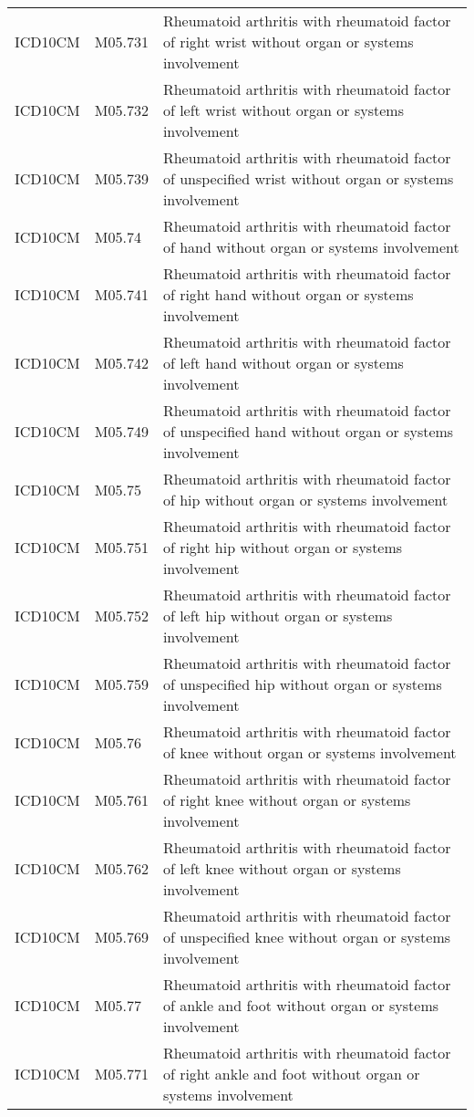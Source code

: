 \begin{longtable}{p{}p{}p{}}
  ICD10CM & M05.731 & Rheumatoid arthritis with rheumatoid factor of right wrist without organ or systems involvement \\ 
  ICD10CM & M05.732 & Rheumatoid arthritis with rheumatoid factor of left wrist without organ or systems involvement \\ 
  ICD10CM & M05.739 & Rheumatoid arthritis with rheumatoid factor of unspecified wrist without organ or systems involvement \\ 
  ICD10CM & M05.74 & Rheumatoid arthritis with rheumatoid factor of hand without organ or systems involvement \\ 
  ICD10CM & M05.741 & Rheumatoid arthritis with rheumatoid factor of right hand without organ or systems involvement \\ 
  ICD10CM & M05.742 & Rheumatoid arthritis with rheumatoid factor of left hand without organ or systems involvement \\ 
  ICD10CM & M05.749 & Rheumatoid arthritis with rheumatoid factor of unspecified hand without organ or systems involvement \\ 
  ICD10CM & M05.75 & Rheumatoid arthritis with rheumatoid factor of hip without organ or systems involvement \\ 
  ICD10CM & M05.751 & Rheumatoid arthritis with rheumatoid factor of right hip without organ or systems involvement \\ 
  ICD10CM & M05.752 & Rheumatoid arthritis with rheumatoid factor of left hip without organ or systems involvement \\ 
  ICD10CM & M05.759 & Rheumatoid arthritis with rheumatoid factor of unspecified hip without organ or systems involvement \\ 
  ICD10CM & M05.76 & Rheumatoid arthritis with rheumatoid factor of knee without organ or systems involvement \\ 
  ICD10CM & M05.761 & Rheumatoid arthritis with rheumatoid factor of right knee without organ or systems involvement \\ 
  ICD10CM & M05.762 & Rheumatoid arthritis with rheumatoid factor of left knee without organ or systems involvement \\ 
  ICD10CM & M05.769 & Rheumatoid arthritis with rheumatoid factor of unspecified knee without organ or systems involvement \\ 
  ICD10CM & M05.77 & Rheumatoid arthritis with rheumatoid factor of ankle and foot without organ or systems involvement \\ 
  ICD10CM & M05.771 & Rheumatoid arthritis with rheumatoid factor of right ankle and foot without organ or systems involvement \\ 

\end{longtable}

